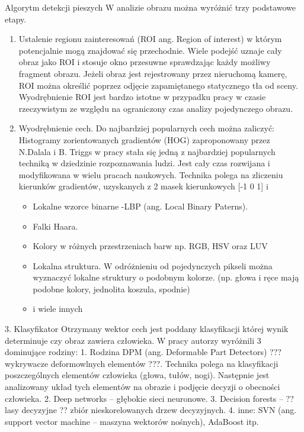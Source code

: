 Algorytm detekcji pieszych
W analizie obrazu można wyróżnić trzy podstawowe etapy.
\begin{enumerate}%
\item Ustalenie regionu zainteresowań (ROI ang. Region of interest) w którym potencjalnie mogą znajdować się przechodnie. Wiele podejść uznaje cały obraz jako ROI i stosuje okno przesuwne sprawdzając każdy możliwy fragment obrazu. Jeżeli obraz jest rejestrowany przez nieruchomą kamerę, ROI można określić poprzez odjęcie zapamiętanego statycznego tła od sceny. Wyodrębnienie ROI jest bardzo istotne w przypadku pracy w czasie rzeczywistym ze względu na ograniczony czas analizy pojedynczego obrazu.
\item  Wyodrębnienie cech. Do najbardziej popularnych cech można zaliczyć:
Histogramy zorientowanych gradientów (HOG) zaproponowany przez N.Dalala i B. Triggs w pracy \cite{dalal2005histograms} stała się jedną z najbardziej popularnych techniką w dziedzinie rozpoznawania ludzi. Jest cały czas rozwijana i modyfikowana w wielu pracach naukowych. Technika polega na zliczeniu kierunków gradientów, uzyskanych z 2 masek kierunkowych [-1 0 1] i \begin{itemize} [-1 0 1]^{T}, w komórkach o określonych wymiarach. Komórki te są organizowane w bloki w obrębie których następuję normalizacja. Wektorem cech jest połączony wszystkich histogramów z wszystkich bloków w jeden wektor.
\item Lokalne wzorce binarne -LBP (ang. Local Binary Paterns). 
\item Falki Haara.
\item Kolory w różnych przestrzeniach barw np. RGB, HSV oraz LUV
\item Lokalna struktura. W odróżnieniu od pojedynczych pikseli można wyznaczyć lokalne struktury o podobnym kolorze. (np. głowa i ręce mają podobne kolory, jednolita koszula, spodnie)
\item i wiele innych
\end{itemize}
\end{enumerate}

3. Klasyfikator
Otrzymany wektor cech jest poddany klasyfikacji której wynik determinuje czy obraz zawiera człowieka. W pracy \cite{benenson2014ten} autorzy wyróżnili 3 dominujące rodziny:
1. Rodzina DPM (ang. Deformable Part Detectors) ??? wykrywacze deformowlnych elementów ???. Technika polega na klasyfikacji poszczególnych elementów człowieka (głowa, tułów, nogi). Następnie  jest analizowany układ tych elementów na obrazie i podjęcie decyzji o obecności człowieka.
2. Deep networks – głębokie sieci neuronowe.
3. Decision forests – ?? lasy decyzyjne ?? zbiór nieskorelowanych drzew decyzyjnych.
4. inne: SVN (ang. support vector machine – maszyna wektorów nośnych), AdaBoost itp.

